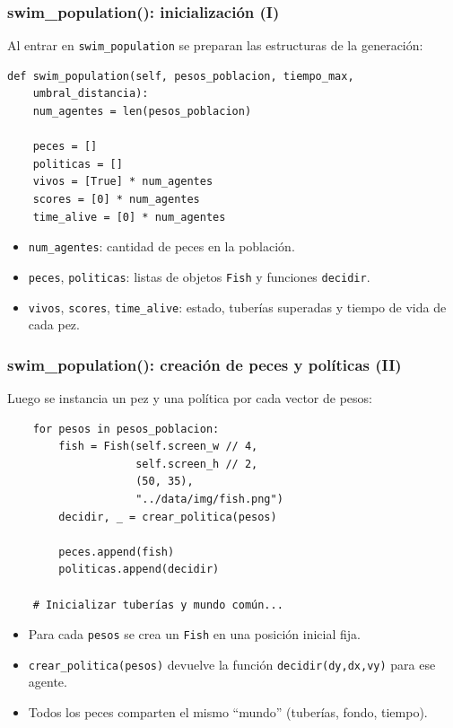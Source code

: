 \documentclass[
	11pt, %
]{beamer}
\begin{document}
\begin{frame}[fragile]
\frametitle{swim\_population(): inicialización (I)}

Al entrar en \texttt{swim\_population} se preparan
las estructuras de la generación:

{\scriptsize
\begin{verbatim}
def swim_population(self, pesos_poblacion, tiempo_max,
    umbral_distancia):
    num_agentes = len(pesos_poblacion)

    peces = []
    politicas = []
    vivos = [True] * num_agentes
    scores = [0] * num_agentes
    time_alive = [0] * num_agentes
\end{verbatim}
}

\begin{itemize}
    \item \texttt{num\_agentes}: cantidad de peces en la población.
    \item \texttt{peces}, \texttt{politicas}: listas de objetos \texttt{Fish}
          y funciones \texttt{decidir}.
    \item \texttt{vivos}, \texttt{scores}, \texttt{time\_alive}: estado,
          tuberías superadas y tiempo de vida de cada pez.
\end{itemize}

\end{frame}

\begin{frame}[fragile]
\frametitle{swim\_population(): creación de peces y políticas (II)}

Luego se instancia un pez y una política por cada vector de pesos:

{\scriptsize
\begin{verbatim}
    for pesos in pesos_poblacion:
        fish = Fish(self.screen_w // 4,
                    self.screen_h // 2,
                    (50, 35),
                    "../data/img/fish.png")
        decidir, _ = crear_politica(pesos)

        peces.append(fish)
        politicas.append(decidir)

    # Inicializar tuberías y mundo común...
\end{verbatim}
}

\begin{itemize}
    \item Para cada \texttt{pesos} se crea un \texttt{Fish} en una
          posición inicial fija.
    \item \texttt{crear\_politica(pesos)} devuelve la función
          \texttt{decidir(dy,dx,vy)} para ese agente.
    \item Todos los peces comparten el mismo “mundo” (tuberías, fondo, tiempo).
\end{itemize}

\end{frame}
\end{document}
